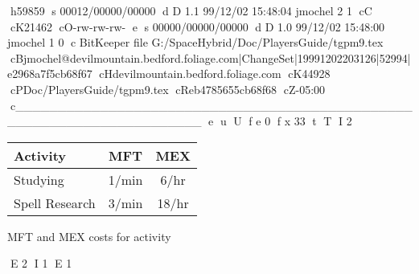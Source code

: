 h59859
s 00012/00000/00000
d D 1.1 99/12/02 15:48:04 jmochel 2 1
cC
cK21462
cO-rw-rw-rw-
e
s 00000/00000/00000
d D 1.0 99/12/02 15:48:00 jmochel 1 0
c BitKeeper file G:/SpaceHybrid/Doc/PlayersGuide/tgpm9.tex
cBjmochel@devilmountain.bedford.foliage.com|ChangeSet|19991202203126|52994|e2968a7f5cb68f67
cHdevilmountain.bedford.foliage.com
cK44928
cPDoc/PlayersGuide/tgpm9.tex
cReb4785655cb68f68
cZ-05:00
c______________________________________________________________________
e
u
U
f e 0
f x 33
t
T
I 2
\begin{SHTable}
	\begin{tabular}{lcc}

	Activity		&	MFT & MEX \\	
\hline
	Studying		  & 1/min & 6/hr \\
	Spell Research	& 3/min & 18/hr \\
    \end{tabular}
    \caption{MFT and MEX costs for activity}
\end{SHTable}
E 2
I 1
E 1
